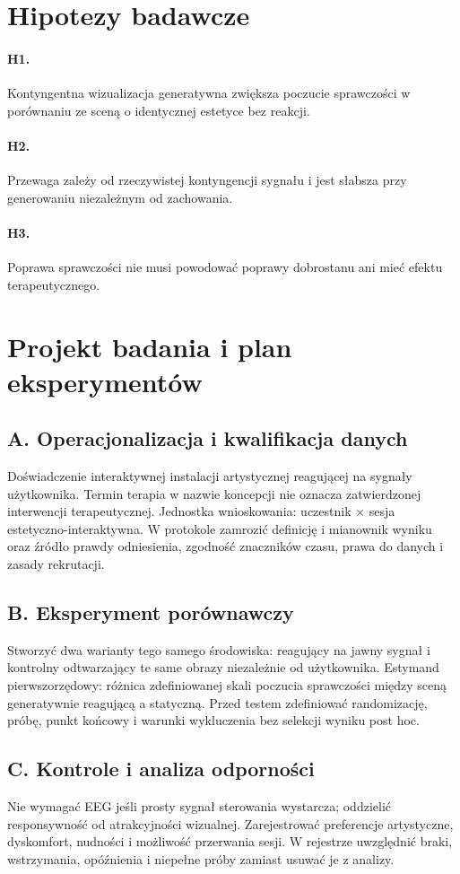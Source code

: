 \documentclass[11pt,a4paper]{article}
\begin{document}
\section{Hipotezy badawcze}
\paragraph{H1.} Kontyngentna wizualizacja generatywna zwiększa poczucie sprawczości w porównaniu ze sceną o identycznej estetyce bez reakcji.
\paragraph{H2.} Przewaga zależy od rzeczywistej kontyngencji sygnału i jest słabsza przy generowaniu niezależnym od zachowania.
\paragraph{H3.} Poprawa sprawczości nie musi powodować poprawy dobrostanu ani mieć efektu terapeutycznego.
\section{Projekt badania i plan eksperymentów}
\subsection{A. Operacjonalizacja i kwalifikacja danych}
Doświadczenie interaktywnej instalacji artystycznej reagującej na sygnały użytkownika. Termin terapia w nazwie koncepcji nie oznacza zatwierdzonej interwencji terapeutycznej. Jednostka wnioskowania: uczestnik × sesja estetyczno-interaktywna. W protokole zamrozić definicję i mianownik wyniku oraz źródło prawdy odniesienia, zgodność znaczników czasu, prawa do danych i zasady rekrutacji.
\subsection{B. Eksperyment porównawczy}
Stworzyć dwa warianty tego samego środowiska: reagujący na jawny sygnał i kontrolny odtwarzający te same obrazy niezależnie od użytkownika. Estymand pierwszorzędowy: różnica zdefiniowanej skali poczucia sprawczości między sceną generatywnie reagującą a statyczną. Przed testem zdefiniować randomizację, próbę, punkt końcowy i warunki wykluczenia bez selekcji wyniku post hoc.
\subsection{C. Kontrole i analiza odporności}
Nie wymagać EEG jeśli prosty sygnał sterowania wystarcza; oddzielić responsywność od atrakcyjności wizualnej. Zarejestrować preferencje artystyczne, dyskomfort, nudności i możliwość przerwania sesji. W rejestrze uwzględnić braki, wstrzymania, opóźnienia i niepełne próby zamiast usuwać je z analizy.
\end{document}
